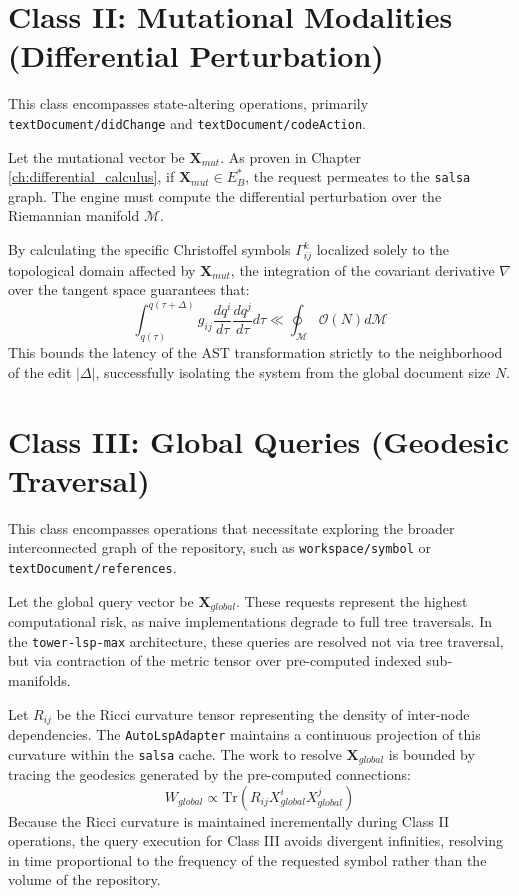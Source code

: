 \section{Class II: Mutational Modalities (Differential Perturbation)}

This class encompasses state-altering operations, primarily \texttt{textDocument/didChange} and \texttt{textDocument/codeAction}.

Let the mutational vector be $\mathbf{X}_{mut}$. As proven in Chapter \ref{ch:differential_calculus}, if $\mathbf{X}_{mut} \in E_B^*$, the request permeates to the \texttt{salsa} graph. The engine must compute the differential perturbation over the Riemannian manifold $\mathcal{M}$. 

By calculating the specific Christoffel symbols $\Gamma^{k}_{ij}$ localized solely to the topological domain affected by $\mathbf{X}_{mut}$, the integration of the covariant derivative $\nabla$ over the tangent space guarantees that:
\begin{equation}
\int_{q(\tau)}^{q(\tau+\Delta)} g_{ij} \frac{dq^i}{d\tau} \frac{dq^j}{d\tau} d\tau \ll \oint_{\mathcal{M}} \mathcal{O}(N) d\mathcal{M}
\end{equation}
This bounds the latency of the AST transformation strictly to the neighborhood of the edit $|\Delta|$, successfully isolating the system from the global document size $N$.

\section{Class III: Global Queries (Geodesic Traversal)}

This class encompasses operations that necessitate exploring the broader interconnected graph of the repository, such as \texttt{workspace/symbol} or \texttt{textDocument/references}.

Let the global query vector be $\mathbf{X}_{global}$. These requests represent the highest computational risk, as naive implementations degrade to full tree traversals. In the \texttt{tower-lsp-max} architecture, these queries are resolved not via tree traversal, but via contraction of the metric tensor over pre-computed indexed sub-manifolds.

Let $R_{ij}$ be the Ricci curvature tensor representing the density of inter-node dependencies. The \texttt{AutoLspAdapter} maintains a continuous projection of this curvature within the \texttt{salsa} cache. The work to resolve $\mathbf{X}_{global}$ is bounded by tracing the geodesics generated by the pre-computed connections:
\begin{equation}
W_{global} \propto \text{Tr}(R_{ij} X_{global}^i X_{global}^j)
\end{equation}
Because the Ricci curvature is maintained incrementally during Class II operations, the query execution for Class III avoids divergent infinities, resolving in time proportional to the frequency of the requested symbol rather than the volume of the repository.